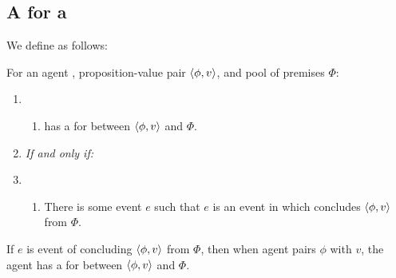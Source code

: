 \subsection{A  for a }
\label{cha:var:ros:W}

\begin{note}
  We define \wit{} as follows:

  \begin{definition}[A \wit{2}]
    \label{def:witnessing}
    For an agent \vAgent{}, proposition-value pair \(\langle \phi, v \rangle\), and pool of premises \(\Phi\):

    \begin{enumerate}[label=]
    \item
      \begin{enumerate}[label=\alph*., ref=(\alph*), series=WitnessDef]
      \item
        \vAgent{} has a \emph{} for \ros{} between \(\langle \phi, v \rangle\) and \(\Phi\).
      \end{enumerate}
    \item
      \emph{If and only if:}
    \item
      \begin{enumerate}[label=\alph*., ref=(\alph*), resume*=WitnessDef]
      \item
        There is some event \(e\) such that \(e\) is an event in which \vAgent{} concludes \(\langle \phi, v \rangle\) from \(\Phi\).
      \end{enumerate}
    \end{enumerate}
    \vspace{-\baselineskip}
  \end{definition}

  If \(e\) is event of concluding \(\langle \phi, v \rangle\) from \(\Phi\), then when agent pairs \(\phi\) with \(v\), the agent has a \wit{} for \ros{} between \(\langle \phi, v \rangle\) and \(\Phi\).
\end{note}

